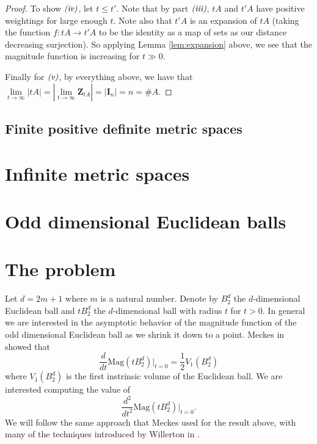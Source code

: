 \documentclass[11pt]{article}
\theoremstyle{definition}
\theoremstyle{definition}
\theoremstyle{plain}
\theoremstyle{plain}
\theoremstyle{plain}
\theoremstyle{definition}
\begin{document}
\begin{proof}
To show $\emph{(iv)}$, let $t \leq t'$. Note that by part $\emph{(iii)}$, $tA$ and $t'A$ have positive weightings for large enough $t$. Note also that $t'A$ is an expansion of $tA$ (taking the function $f:tA \to t'A$ to be the identity as a map of sets as our distance decreasing surjection). So applying Lemma \ref{lem:expansion} above, we see that the magnitude function is increasing for $t \gg 0$.

Finally for $\emph{(v)}$, by everything above, we have that $\lim\limits_{t\to\infty} \vert tA \vert = \left\vert \lim\limits_{t\to\infty}\mathbf{Z}_{tA}\right\vert = \vert \mathbf{I}_n\vert = n = \#A$.
\end{proof}

\subsection{Finite positive definite metric spaces}

\section{Infinite metric spaces}

\section{Odd dimensional Euclidean balls}

\section{The problem}

Let $d = 2m+1$ where $m$ is a natural number. Denote by $B_2^d$ the $d$-dimensional Euclidean ball and $tB_2^d$ the $d$-dimensional ball with radius $t$ for $t > 0$. In general we are interested in the asymptotic behavior of the magnitude function of the odd dimensional Euclidean ball as we shrink it down to a point. Meckes in \cite{meckes_magnitude_2019} showed that
\begin{equation*}
\frac{d}{dt}\text{Mag}(tB_2^d)\big\vert_{t=0} = \frac{1}{2}V_1(B_2^d)
\end{equation*}
where $V_1(B_2^d)$ is the first instrinsic volume of the Euclidean ball.
We are interested computing the value of
\begin{equation*}
\frac{d^2}{dt^2}\text{Mag}(tB_2^d)\big\vert_{t=0}.
\end{equation*}
We will follow the same approach that Meckes used for the result above, with many of the techniques introduced by Willerton in \cite{willerton_magnitude_2017}.
\end{document}
